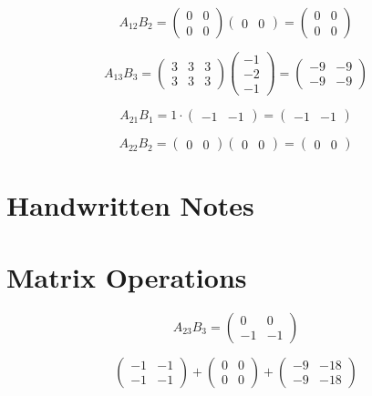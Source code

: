 \[
A_{12} B_2 = \begin{pmatrix}
0 & 0 \\
0 & 0
\end{pmatrix}
\begin{pmatrix}
0 & 0
\end{pmatrix}
= \begin{pmatrix}
0 & 0 \\
0 & 0
\end{pmatrix}
\]

\[
A_{13} B_3 = \begin{pmatrix}
3 & 3 & 3 \\
3 & 3 & 3
\end{pmatrix}
\begin{pmatrix}
-1 \\
-2 \\
-1
\end{pmatrix}
= \begin{pmatrix}
-9 & -9 \\
-9 & -9
\end{pmatrix}
\]

\[
A_{21} B_1 = 1 \cdot \begin{pmatrix}
-1 & -1
\end{pmatrix}
= \begin{pmatrix}
-1 & -1
\end{pmatrix}
\]

\[
A_{22} B_2 = \begin{pmatrix}
0 & 0
\end{pmatrix}
\begin{pmatrix}
0 & 0
\end{pmatrix}
= \begin{pmatrix}
0 & 0
\end{pmatrix}
\]

\section{Handwritten Notes}





\section*{Matrix Operations}
\[
A_{23} B_{3} = \begin{pmatrix}
0 & 0 \\
-1 & -1
\end{pmatrix}
\]

\[
\begin{pmatrix}
-1 & -1 \\
-1 & -1
\end{pmatrix}
+ \begin{pmatrix}
0 & 0 \\
0 & 0
\end{pmatrix}
+ \begin{pmatrix}
-9 & -18 \\
-9 & -18
\end{pmatrix}
\]

